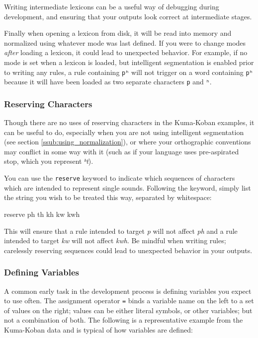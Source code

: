 \documentclass[10pt,letterpaper]{article}
\newcounter{excounter}
\newenvironment{vex}[1]{
	\vspace{1em}
	\refstepcounter{excounter}
	\noindent\makebox[3em][l]{(\arabic{excounter}\label{#1})}
	\minipage{\textwidth}
	\verbatim
}{
	\endverbatim
	\endminipage
	\vspace{1em}
}
\begin{document}
\noindent
Writing intermediate lexicons can be a useful way of debugging during development, and ensuring that your outputs look correct at intermediate stages.

Finally when opening a lexicon from disk, it will be read into memory and normalized using whatever mode was last defined. If you were to change modes \emph{after} loading a lexicon, it could lead to unexpected behavior. For example, if no mode is set when a lexicon is loaded, but intelligent segmentation is enabled prior to writing any rules, a rule containing \texttt{pʰ} will not trigger on a word containing \texttt{pʰ} because it will have been loaded as two separate characters \texttt{p} and \texttt{ʰ}. 


\subsubsection{Reserving Characters} 
\label{ssub:reserving_characters}
Though there are no uses of reserving characters in the Kuma-Koban examples, it can be useful to do, especially when you are not using intelligent segmentation (see section \ref{ssub:using_normalization}), or where your orthographic conventions may conflict in some way with it (such as if your language uses pre-aspirated stop, which you represent \emph{ʰt}).

You can use the \texttt{reserve} keyword to indicate which sequences of characters which are intended to represent single sounds. Following the keyword, simply list the string you wish to be treated this way, separated by whitespace:

\begin{vex}{ex:reserve}
reserve ph th kh kw kwh
\end{vex}

\noindent
This will ensure that a rule intended to target \emph{p} will not affect \emph{ph} and a rule intended to target \emph{kw} will not affect \emph{kwh}. Be mindful when writing rules; carelessly reserving sequences could lead to unexpected behavior in your outputs.


\subsubsection{Defining Variables}
\label{ssub:defining_variables}
A common early task in the development process is defining variables you expect to use often. The assignment operator \texttt{=} binds a variable name on the left to a set of values on the right; values can be either literal symbols, or other variables; but not a combination of both. The following is a representative example from the Kuma-Koban data and is typical of how variables are defined:
\end{document}
